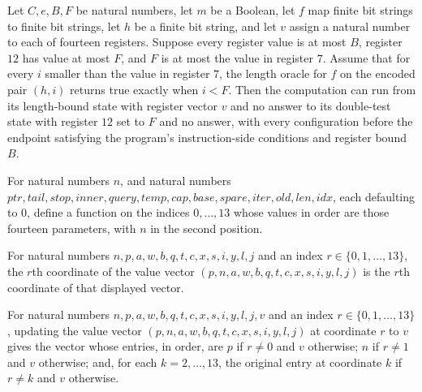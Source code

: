 \begin{lemma}
\label{Complexity.comp_length_search}
\leanok
{}
Let $C,e,B,F$ be natural numbers, let $m$ be a Boolean, let $f$ map finite bit strings
to finite bit strings, let $h$ be a finite bit string, and let $v$ assign a natural
number to each of fourteen registers. Suppose every register value is at most $B$,
register $12$ has value at most $F$, and $F$ is at most the value in register $7$.
Assume that for every $i$ smaller than the value in register $7$, the length oracle for
$f$ on the encoded pair $(h,i)$ returns true exactly when $i<F$. Then the computation
can run from its length-bound state with register vector $v$ and no answer to its
double-test state with register $12$ set to $F$ and no answer, with every configuration
before the endpoint satisfying the program’s instruction-side conditions and register
bound $B$.
\end{lemma}

\begin{definition}
\label{Complexity.compValues}
\leanok
For natural numbers $n$, and natural numbers
$\mathit{ptr},\mathit{tail},\mathit{stop},\mathit{inner},\mathit{query},\mathit{temp},\mathit{cap},\mathit{base},\mathit{spare},\mathit{iter},\mathit{old},\mathit{len},\mathit{idx}$,
each defaulting to $0$, define a function on the indices $0,\ldots,13$ whose values in
order are those fourteen parameters, with $n$ in the second position.
\end{definition}

\begin{lemma}
\label{Complexity.compValues_apply}
\leanok
{}
For natural numbers $n,p,a,w,b,q,t,c,x,s,i,y,l,j$ and an index $r\in\{0,1,\ldots,13\}$,
the $r$th coordinate of the value vector $(p,n,a,w,b,q,t,c,x,s,i,y,l,j)$ is the $r$th
coordinate of that displayed vector.
\end{lemma}

\begin{lemma}
\label{Complexity.compValues_update}
\leanok
{}
For natural numbers $n,p,a,w,b,q,t,c,x,s,i,y,l,j,v$ and an index
$r\in\{0,1,\ldots,13\}$, updating the value vector $(p,n,a,w,b,q,t,c,x,s,i,y,l,j)$ at
coordinate $r$ to $v$ gives the vector whose entries, in order, are $p$ if $r\ne0$ and
$v$ otherwise; $n$ if $r\ne1$ and $v$ otherwise; and, for each $k=2,\ldots,13$, the
original entry at coordinate $k$ if $r\ne k$ and $v$ otherwise.
\end{lemma}

